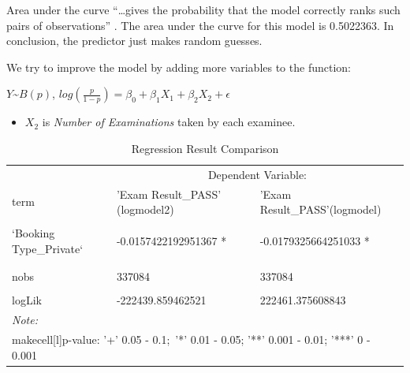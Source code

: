 \documentclass[11pt,a4paper,]{article}
\providecommand{\tightlist}{%
  \setlength{\itemsep}{0pt}\setlength{\parskip}{0pt}}
\begin{document}
Area under the curve ``\ldots gives the probability that the model correctly ranks such pairs of observations'' \textcite{bartlett_2014}. The area under the curve for this model is 0.5022363. In conclusion, the predictor just makes random guesses.

We try to improve the model by adding more variables to the function:

\(Y\)\textasciitilde{}\(B(p)\), \(log(\frac{p}{1-p}) = \beta_0 +\beta_1 X_1 +\beta_2 X_2 + \epsilon\)

\begin{itemize}
\tightlist
\item
  \(X_2\) is \emph{Number of Examinations} taken by each examinee.
\end{itemize}

\begin{table}[!h]

\caption{\label{tab:comparison}Regression Result Comparison}
\centering
\begin{tabular}[t]{lll}
\toprule
\multicolumn{1}{c}{ } & \multicolumn{2}{c}{Dependent Variable:} \\
\cmidrule(l{3pt}r{3pt}){2-3}
term & 'Exam Result\_PASS' (logmodel2) & 'Exam Result\_PASS'(logmodel)\\
\midrule
\cellcolor{gray!6}{(Intercept)} & \cellcolor{gray!6}{0.522573474570028 ***} & \cellcolor{gray!6}{0.533407196218835 ***}\\
`Booking Type\_Private` & -0.0157422192951367 * & -0.0179325664251033 *\\
\addlinespace[0.3em]
\multicolumn{3}{l}{\textbf{ }}\\
\cellcolor{gray!6}{\hspace{1em}`Number of Examinations`} & \cellcolor{gray!6}{0.00169271410738006 ***} & \cellcolor{gray!6}{}\\
\hspace{1em}nobs & 337084 & 337084\\
\cellcolor{gray!6}{\hspace{1em}AIC} & \cellcolor{gray!6}{444885.718925042} & \cellcolor{gray!6}{444926.751217685}\\
logLik & -222439.859462521 & 222461.375608843\\
\bottomrule
\multicolumn{3}{l}{\rule{0pt}{1em}\textit{Note: }}\\
\multicolumn{3}{l}{\rule{0pt}{1em}makecell[l]{p-value: '+' 0.05 - 0.1;\           '*' 0.01 - 0.05; '**' 0.001 - 0.01; '***' 0 - 0.001}}\\
\end{tabular}
\end{table}
\end{document}
